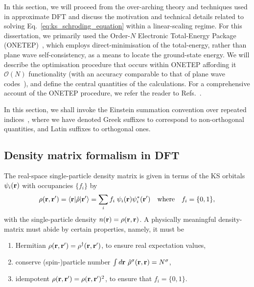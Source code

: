 {
In this section, 
we will proceed from 
the over-arching theory 
and techniques used in approximate DFT 
and discuss the motivation 
and technical details   
related to solving 
Eq.~\eqref{eq:ks_schroding_equation}
within a linear-scaling regime.
% 
For this dissertation, 
we primarily used the 
Order-$N$ Electronic Total-Energy Package 
(\textsc{ONETEP})~\cite{skylaris2005introducing,0953-8984-17-37-012,PSSB:PSSB200541457,0953-8984-20-29-294207,0953-8984-20-6-064209,HINE20091041,hine2009linear,PhysRevB.85.085107}, 
which employs direct-minimisation 
of the total-energy, 
rather than plane wave self-consistency, 
as a means to locate 
the ground-state energy.
%
We will describe the optimisation procedure that 
occurs within \textsc{ONETEP} 
affording it $\mathcal{O}(N)$ functionality  
(with an accuracy comparable to 
that of plane wave 
codes~\cite{skylaris2005introducing,PhysRevB.51.10157,PhysRevLett.69.3547,hine2009linear}),
and define the central quantities 
of the calculations.
%
For a comprehensive account  
of the \textsc{ONETEP} procedure, 
we refer the reader to 
Refs.~\cite{skylaris2005introducing,0953-8984-17-37-012,PSSB:PSSB200541457,0953-8984-20-29-294207,0953-8984-20-6-064209,HINE20091041,hine2009linear,PhysRevB.85.085107}.}

{
In this section,
we shall invoke the Einstein summation convention 
over repeated indices~\cite{Einstein1916}, 
where {we have denoted} 
Greek suffixes {to correspond} 
to non-orthogonal quantities, 
and Latin suffixes to orthogonal ones.}


\subsection{Density matrix formalism in DFT}
\label{sec:density_matrix}
{
The real-space single-particle density matrix 
is given in terms of the KS orbitals $\psi_i({\bf r})$ 
with occupancies $\{f_i\}$ by 
%
\begin{equation}
\rho({\bf r},{\bf r}')=\langle{\bf r}\vert\hat{\rho}\vert{\bf r}'\rangle
=\sum_i f_i\; \psi_i({\bf r})\psi_i^*({\bf r}')
\quad\mbox{where}\quad
f_i=\{0,1\}, 
\label{eq:1_particle_dens_matrix1}
\end{equation}
%
with the single-particle density 
$n({\bf r})=\rho({\bf r}, {\bf r})$.
%
A physically meaningful 
density-matrix must 
abide by certain properties, 
namely, it must be 
%
\begin{enumerate}
\item
Hermitian $\rho({\bf r},{\bf r}')=\rho^\dagger({\bf r},{\bf r}')$, 
to ensure real expectation values, 
\item
conserve (spin-)particle number 
$\int d{\bf r}\ \hat\rho^\sigma({\bf r},{\bf r})=N^\sigma$,
\item
idempotent 
$\rho({\bf r},{\bf r}')=\rho({\bf r},{\bf r}')^2$,  
to  ensure that 
$ f_i =\{0,1\}$.
\end{enumerate}}

